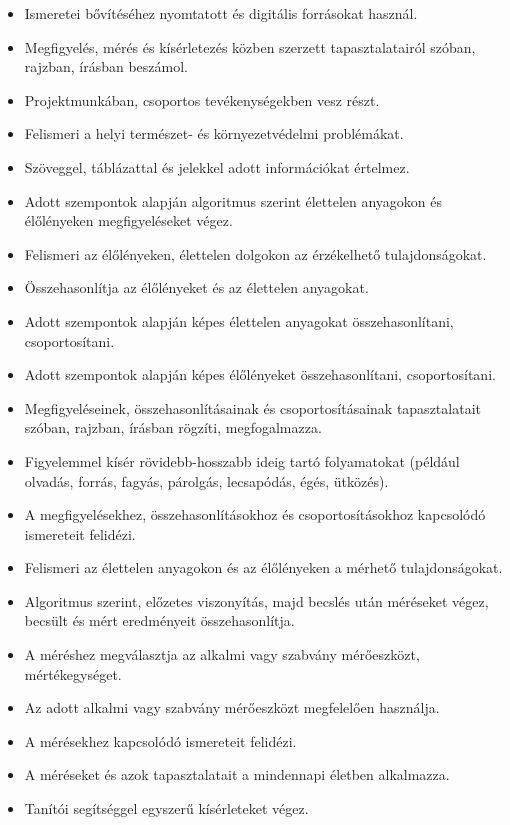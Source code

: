 \begin{itemize}
\item
  Ismeretei bővítéséhez nyomtatott és digitális forrásokat használ.
\item
  Megfigyelés, mérés és kísérletezés közben szerzett tapasztalatairól
  szóban, rajzban, írásban beszámol.
\item
  Projektmunkában, csoportos tevékenységekben vesz részt.
\item
  Felismeri a helyi természet- és környezetvédelmi problémákat.
\item
  Szöveggel, táblázattal és jelekkel adott információkat értelmez.
\item
  Adott szempontok alapján algoritmus szerint élettelen anyagokon és
  élőlényeken megfigyeléseket végez.
\item
  Felismeri az élőlényeken, élettelen dolgokon az érzékelhető
  tulajdonságokat.
\item
  Összehasonlítja az élőlényeket és az élettelen anyagokat.
\item
  Adott szempontok alapján képes élettelen anyagokat összehasonlítani,
  csoportosítani.
\item
  Adott szempontok alapján képes élőlényeket összehasonlítani,
  csoportosítani.
\item
  Megfigyeléseinek, összehasonlításainak és csoportosításainak
  tapasztalatait szóban, rajzban, írásban rögzíti, megfogalmazza.
\item
  Figyelemmel kísér rövidebb-hosszabb ideig tartó folyamatokat (például
  olvadás, forrás, fagyás, párolgás, lecsapódás, égés, ütközés).
\item
  A megfigyelésekhez, összehasonlításokhoz és csoportosításokhoz
  kapcsolódó ismereteit felidézi.
\item
  Felismeri az élettelen anyagokon és az élőlényeken a mérhető
  tulajdonságokat.
\item
  Algoritmus szerint, előzetes viszonyítás, majd becslés után méréseket
  végez, becsült és mért eredményeit összehasonlítja.
\item
  A méréshez megválasztja az alkalmi vagy szabvány mérőeszközt,
  mértékegységet.
\item
  Az adott alkalmi vagy szabvány mérőeszközt megfelelően használja.
\item
  A mérésekhez kapcsolódó ismereteit felidézi.
\item
  A méréseket és azok tapasztalatait a mindennapi életben alkalmazza.
\item
  Tanítói segítséggel egyszerű kísérleteket végez.

\end{itemize}
